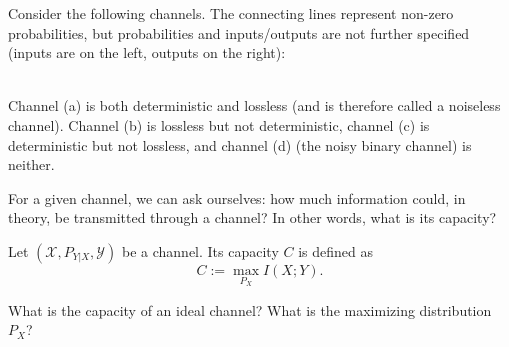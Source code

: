 \begin{example}\label{example:channel}
Consider the following channels. The connecting lines represent non-zero probabilities, but probabilities and inputs/outputs are not further specified (inputs are on the left, outputs on the right):\\
\\Channel (a) is both deterministic and lossless (and is therefore called a noiseless channel). Channel (b) is lossless but not deterministic, channel (c) is deterministic but not lossless, and channel (d) (the noisy binary channel) is neither.
\end{example}

For a given channel, we can ask ourselves: how much information could, in theory, be transmitted through a channel? In other words, what is its capacity?

\begin{definition}
Let $(\mathcal{X}, P_{Y|X}, \mathcal{Y})$ be a channel. Its capacity $C$ is defined as
\[
C := \max_{P_X} I(X;Y).
\]
\end{definition}

\begin{exercise}
What is the capacity of an ideal channel? What is the maximizing distribution $P_X$?
\end{exercise}



